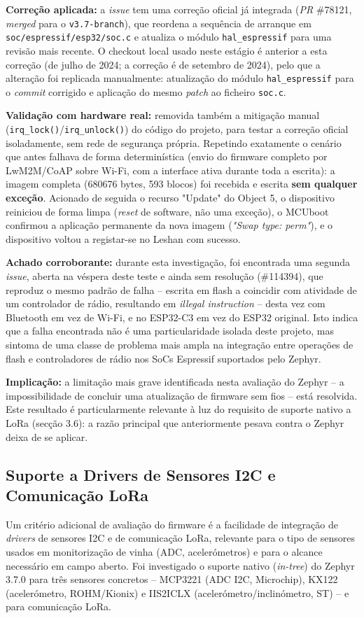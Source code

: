 \documentclass[a4paper,12pt]{article}
\begin{document}
\textbf{Correção aplicada:} a \textit{issue} tem uma correção oficial já integrada (\textit{PR} \#78121, \textit{merged} para o \texttt{v3.7-branch}), que reordena a sequência de arranque em \texttt{soc/espressif/esp32/soc.c} e atualiza o módulo \texttt{hal\_espressif} para uma revisão mais recente. O checkout local usado neste estágio é anterior a esta correção (de julho de 2024; a correção é de setembro de 2024), pelo que a alteração foi replicada manualmente: atualização do módulo \texttt{hal\_espressif} para o \textit{commit} corrigido e aplicação do mesmo \textit{patch} ao ficheiro \texttt{soc.c}.

\textbf{Validação com hardware real:} removida também a mitigação manual (\texttt{irq\_lock()}/\texttt{irq\_unlock()}) do código do projeto, para testar a correção oficial isoladamente, sem rede de segurança própria. Repetindo exatamente o cenário que antes falhava de forma determinística (envio do firmware completo por LwM2M/CoAP sobre Wi-Fi, com a interface ativa durante toda a escrita): a imagem completa (680676 bytes, 593 blocos) foi recebida e escrita \textbf{sem qualquer exceção}. Acionado de seguida o recurso "Update" do Object 5, o dispositivo reiniciou de forma limpa (\textit{reset} de software, não uma exceção), o MCUboot confirmou a aplicação permanente da nova imagem (\textit{"Swap type: perm"}), e o dispositivo voltou a registar-se no Leshan com sucesso.

\textbf{Achado corroborante:} durante esta investigação, foi encontrada uma segunda \textit{issue}, aberta na véspera deste teste e ainda sem resolução (\#114394), que reproduz o mesmo padrão de falha -- escrita em flash a coincidir com atividade de um controlador de rádio, resultando em \textit{illegal instruction} -- desta vez com Bluetooth em vez de Wi-Fi, e no ESP32-C3 em vez do ESP32 original. Isto indica que a falha encontrada não é uma particularidade isolada deste projeto, mas sintoma de uma classe de problema mais ampla na integração entre operações de flash e controladores de rádio nos SoCs Espressif suportados pelo Zephyr.

\textbf{Implicação:} a limitação mais grave identificada nesta avaliação do Zephyr -- a impossibilidade de concluir uma atualização de firmware sem fios -- está resolvida. Este resultado é particularmente relevante à luz do requisito de suporte nativo a LoRa (secção 3.6): a razão principal que anteriormente pesava contra o Zephyr deixa de se aplicar.

\subsection{Suporte a Drivers de Sensores I2C e Comunicação LoRa}
Um critério adicional de avaliação do firmware é a facilidade de integração de \textit{drivers} de sensores I2C e de comunicação LoRa, relevante para o tipo de sensores usados em monitorização de vinha (ADC, acelerómetros) e para o alcance necessário em campo aberto. Foi investigado o suporte nativo (\textit{in-tree}) do Zephyr 3.7.0 para três sensores concretos -- MCP3221 (ADC I2C, Microchip), KX122 (acelerómetro, ROHM/Kionix) e IIS2ICLX (acelerómetro/inclinómetro, ST) -- e para comunicação LoRa.
\end{document}

